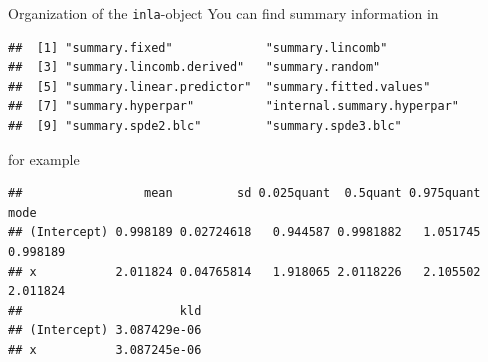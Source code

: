 \documentclass[
  handout]{beamer}
\newenvironment{Shaded}{\begin{snugshade}}{\end{snugshade}}
\newcommand{\NormalTok}[1]{#1}
\newcommand{\SpecialCharTok}[1]{\textcolor[rgb]{0.00,0.00,0.00}{#1}}
\begin{document}
\begin{frame}[fragile]{Organization of the \texttt{inla}-object}
\protect\hypertarget{organization-of-the-inla-object-1}{}
You can find summary information in \small

\begin{verbatim}
##  [1] "summary.fixed"             "summary.lincomb"          
##  [3] "summary.lincomb.derived"   "summary.random"           
##  [5] "summary.linear.predictor"  "summary.fitted.values"    
##  [7] "summary.hyperpar"          "internal.summary.hyperpar"
##  [9] "summary.spde2.blc"         "summary.spde3.blc"
\end{verbatim}

\normalsize

for example

\scriptsize

\begin{Shaded}
\end{Shaded}

\begin{verbatim}
##                 mean         sd 0.025quant  0.5quant 0.975quant     mode
## (Intercept) 0.998189 0.02724618   0.944587 0.9981882   1.051745 0.998189
## x           2.011824 0.04765814   1.918065 2.0118226   2.105502 2.011824
##                      kld
## (Intercept) 3.087429e-06
## x           3.087245e-06
\end{verbatim}

\normalsize
\end{frame}
\end{document}
